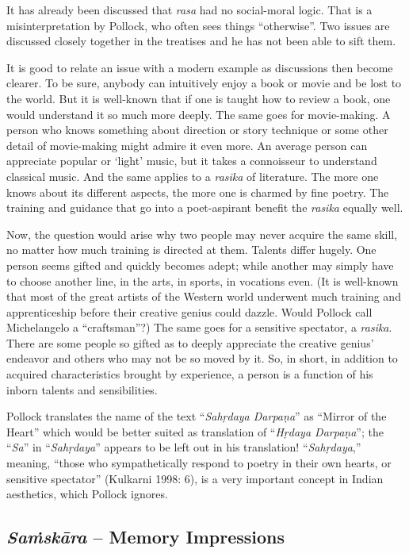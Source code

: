 It has already been discussed that \textit{rasa }had no social-moral logic. That is a misinterpretation by Pollock, who often sees things “otherwise”. Two issues are discussed closely together in the treatises and he has not been able to sift them.

It is good to relate an issue with a modern example as discussions then become clearer. To be sure, anybody can intuitively enjoy a book or movie and be lost to the world. But it is well-known that if one is taught how to review a book, one would understand it so much more deeply. The same goes for movie-making. A person who knows something about direction or story technique or some other detail of movie-making might admire it even more. An average person can appreciate popular or ‘light’ music, but it takes a connoisseur to understand classical music. And the same applies to a \textit{rasika }of literature. The more one knows about its different aspects, the more one is charmed by fine poetry. The training and guidance that go into a poet-aspirant benefit the \textit{rasika} equally well.

Now, the question would arise why two people may never acquire the same skill, no matter how much training is directed at them. Talents differ hugely. One person seems gifted and quickly becomes adept; while another may simply have to choose another line, in the arts, in sports, in vocations even. (It is well-known that most of the great artists of the Western world underwent much training and apprenticeship before their creative genius could dazzle. Would Pollock call Michelangelo a “craftsman”?) The same goes for a sensitive spectator, a \textit{rasika}. There are some people so gifted as to deeply appreciate the creative genius’ endeavor and others who may not be so moved by it. So, in short, in addition to acquired characteristics brought by experience, a person is a function of his inborn talents and sensibilities.

Pollock translates the name of the text “\textit{Sahṛdaya Darpaṇa}” as “Mirror of the Heart” which would be better suited as translation of “\textit{Hṛdaya Darpaṇa}”; the “\textit{Sa}” in “\textit{Sahṛdaya}” appears to be left out in his translation! “\textit{Sahṛdaya},” meaning, “those who sympathetically respond to poetry in their own hearts, or sensitive spectator” (Kulkarni 1998: 6), is a very important concept in Indian aesthetics, which Pollock ignores.


\subsection*{\textit{Saṁskāra} – Memory Impressions}


